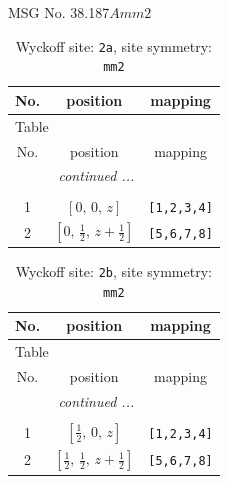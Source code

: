 \documentclass[fleqn,8pt]{jsarticle}
\begin{document}
\setcounter{MaxMatrixCols}{32}

\renewcommand{\tablename}{Table~}
\renewcommand{\figurename}{Figure~}
\begin{center}
\LARGE
MSG No. 38.187\quad$Amm2$
\end{center}
\renewcommand{\arraystretch}{1.2}
\begin{longtable}{ccc}
\caption{Wyckoff site: {\tt 2a}, site symmetry: {\tt mm2}}
 \\
 \hline \hline
No. & position & mapping \\ \hline \endfirsthead

\multicolumn{2}{l}{\tablename\ \thetable{}} \\
 \hline \hline
No. & position & mapping \\ \hline \endhead

 \hline \hline
\multicolumn{2}{r}{\footnotesize\it continued ...} \\ \endfoot

 \hline \hline
\multicolumn{2}{r}{} \\ \endlastfoot

1 & $\left[ 0,\, 0,\, z \right]$ & {\tt [1,2,3,4]} \\ \hline
2 & $\left[ 0,\, \frac{1}{2},\, z + \frac{1}{2} \right]$ & {\tt [5,6,7,8]} \\
\end{longtable}
\renewcommand{\arraystretch}{1.2}
\begin{longtable}{ccc}
\caption{Wyckoff site: {\tt 2b}, site symmetry: {\tt mm2}}
 \\
 \hline \hline
No. & position & mapping \\ \hline \endfirsthead

\multicolumn{2}{l}{\tablename\ \thetable{}} \\
 \hline \hline
No. & position & mapping \\ \hline \endhead

 \hline \hline
\multicolumn{2}{r}{\footnotesize\it continued ...} \\ \endfoot

 \hline \hline
\multicolumn{2}{r}{} \\ \endlastfoot

1 & $\left[ \frac{1}{2},\, 0,\, z \right]$ & {\tt [1,2,3,4]} \\ \hline
2 & $\left[ \frac{1}{2},\, \frac{1}{2},\, z + \frac{1}{2} \right]$ & {\tt [5,6,7,8]} \\
\end{longtable}
\end{document}
